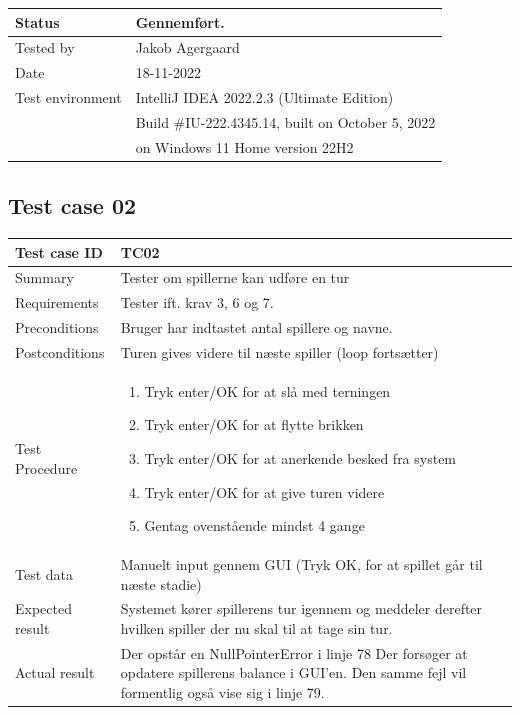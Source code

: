 \documentclass{article}
\begin{document}
\begin{tabular}{ | m{} | m{}|}
    \hline
    Status & Gennemført.\\
    \hline
    Tested by & Jakob Agergaard\\
    \hline
    Date & 18-11-2022\\
    \hline
    Test environment & IntelliJ IDEA 2022.2.3 (Ultimate Edition)\\
      & Build \#IU-222.4345.14, built on October 5, 2022\\
      & on Windows 11 Home version 22H2\\
    \hline
\end{tabular}
\subsection{Test case 02}
\begin{tabular}{ | m{} | m{}|}
    \hline
    Test case ID & TC02  \\
    \hline
    Summary & Tester om spillerne kan udføre en tur\\
    \hline
    Requirements & Tester ift. krav 3, 6 og 7.\\
    \hline
    Preconditions & Bruger har indtastet antal spillere og navne.\\
    \hline
    Postconditions & Turen gives videre til næste spiller (loop fortsætter)\\
    \hline
    Test Procedure & \begin{enumerate}[itemsep=0.1mm]
        \item Tryk enter/OK for at slå med terningen
        \item Tryk enter/OK for at flytte brikken
        \item Tryk enter/OK for at anerkende besked fra system
        \item Tryk enter/OK for at give turen videre
        \item Gentag ovenstående mindst 4 gange
    \end{enumerate}\\
    \hline
    Test data & Manuelt input gennem GUI (Tryk OK, for at spillet går til næste stadie)\\
    \hline
    Expected result & Systemet kører spillerens tur igennem og meddeler derefter hvilken spiller der nu skal til at tage sin tur.\\
    \hline
    Actual result & Der opstår en NullPointerError i linje 78 Der forsøger at opdatere spillerens balance i GUI'en. Den samme fejl vil formentlig også vise sig i linje 79.\\

\end{tabular}
\end{document}
